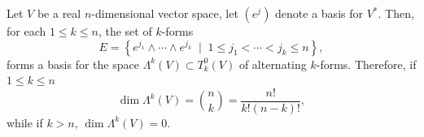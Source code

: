 \begin{proposition}\label{prop:dimLkV}
	Let $V$ be a real $n$-dimensional vector space, let $(e^j)$ denote a basis for $V^*$.
	Then, for each $1\leq k \leq n$, the set of $k$-forms
	\begin{equation}
		E = \left\{
		e^{j_1}\wedge\cdots\wedge e^{j_k} \;\mid\; 1\leq j_1<\cdots<j_k\leq n
		\right\},
	\end{equation}
	forms a basis for the space $\Lambda^k(V) \subset T_k^0(V)$ of alternating $k$-forms.
	Therefore, if $1\leq k\leq n$
	\begin{equation}
		\dim \Lambda^k(V) = \binom{n}{k} = \frac{n!}{k!(n-k)!},
	\end{equation}
	while if $k>n$, $\dim \Lambda^k(V) = 0$.
\end{proposition}

